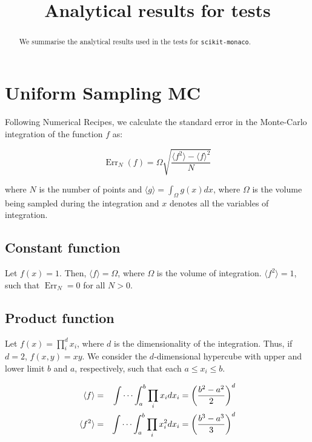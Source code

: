 \documentclass[a4paper]{article}
\title{Analytical results for tests}
\newcommand{\expval}[1]{\langle #1 \rangle}
\DeclareMathOperator{\Err}{Err}
\begin{document}
\maketitle

\begin{abstract}
We summarise the analytical results used in the tests for
\verb=scikit-monaco=. 
\end{abstract}

\section{Uniform Sampling MC}

Following Numerical Recipes, we calculate the standard error in the Monte-Carlo
integration of the function $f$ as:

\begin{equation}
    \Err_N(f) = \Omega \sqrt{\frac{\expval{f^2}-\expval{f}^2}{N}}
\end{equation}

where $N$ is the number of points and $\expval{g} = \int_\Omega g(x) dx$, where
$\Omega$ is the volume being sampled during the integration and $x$ denotes all
the variables of integration.


\subsection{Constant function}

Let $f(x) = 1$. Then, $\expval{f} = \Omega$, where $\Omega$ is the volume of
integration. $\expval{f^2} = 1$, such that $\Err_N = 0$ for all $N > 0$.


\subsection{Product function}

Let $f(x) = \prod_i^d x_i$, where $d$ is the dimensionality of the
integration. Thus, if $d = 2$, $f(x,y) = xy$. We consider the $d$-dimensional
hypercube with upper and lower limit $b$ and $a$, respectively, such that each
$a \le x_i \le b$. 

\begin{eqnarray}
    \expval{f} &=& \idotsint_a^b \prod_i x_i dx_i =
    \left(\frac{b^2-a^2}{2}\right)^d \\
    \expval{f^2} &=& \idotsint_a^b \prod_i x_i^2 dx_i =
    \left(\frac{b^3-a^3}{3}\right)^d 
\end{eqnarray}
\end{document}
